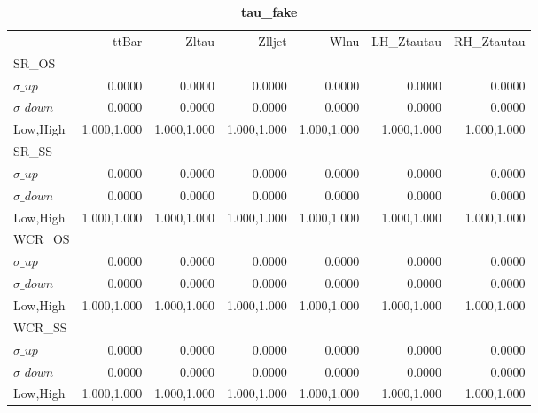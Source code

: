 \documentclass[11pt,oneside,a4paper]{article}
\begin{document}
\begin{table}
\centering
\caption{\bf{tau\_fake}}
\begin{tabular}{lrrrrrr}
& ttBar & Zltau & Zlljet & Wlnu & LH\_Ztautau & RH\_Ztautau \\
SR\_OS &  &  &  &  &  &  \\
$\sigma\_up$ & 0.0000 & 0.0000 & 0.0000 & 0.0000 & 0.0000 & 0.0000 \\
$\sigma\_down$ & 0.0000 & 0.0000 & 0.0000 & 0.0000 & 0.0000 & 0.0000 \\
Low,High & 1.000,1.000 & 1.000,1.000 & 1.000,1.000 & 1.000,1.000 & 1.000,1.000 & 1.000,1.000 \\

\hline
SR\_SS &  &  &  &  &  &  \\
$\sigma\_up$ & 0.0000 & 0.0000 & 0.0000 & 0.0000 & 0.0000 & 0.0000 \\
$\sigma\_down$ & 0.0000 & 0.0000 & 0.0000 & 0.0000 & 0.0000 & 0.0000 \\
Low,High & 1.000,1.000 & 1.000,1.000 & 1.000,1.000 & 1.000,1.000 & 1.000,1.000 & 1.000,1.000 \\

\hline
WCR\_OS &  &  &  &  &  &  \\
$\sigma\_up$ & 0.0000 & 0.0000 & 0.0000 & 0.0000 & 0.0000 & 0.0000 \\
$\sigma\_down$ & 0.0000 & 0.0000 & 0.0000 & 0.0000 & 0.0000 & 0.0000 \\
Low,High & 1.000,1.000 & 1.000,1.000 & 1.000,1.000 & 1.000,1.000 & 1.000,1.000 & 1.000,1.000 \\

\hline
WCR\_SS &  &  &  &  &  &  \\
$\sigma\_up$ & 0.0000 & 0.0000 & 0.0000 & 0.0000 & 0.0000 & 0.0000 \\
$\sigma\_down$ & 0.0000 & 0.0000 & 0.0000 & 0.0000 & 0.0000 & 0.0000 \\
Low,High & 1.000,1.000 & 1.000,1.000 & 1.000,1.000 & 1.000,1.000 & 1.000,1.000 & 1.000,1.000 \\

\hline
\end{tabular}
\end{table}
\end{document}
